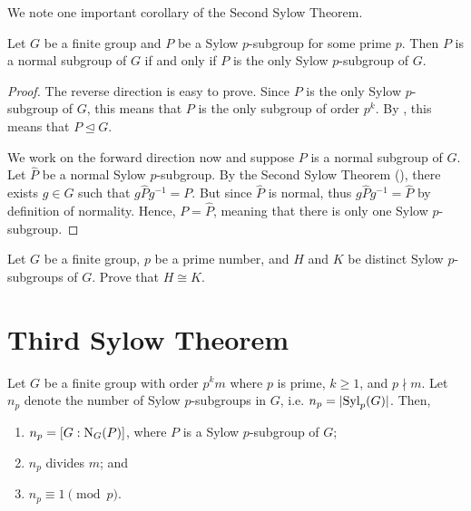 We note one important corollary of the Second Sylow Theorem.
\begin{corollary}\label{corollary-sylow-subgroup-is-normal-if-it-is-unique}
    Let $G$ be a finite group and $P$ be a Sylow $p$-subgroup for some prime $p$. Then $P$ is a normal subgroup of $G$ if and only if $P$ is the only Sylow $p$-subgroup of $G$.
\end{corollary}
\begin{proof}
    The reverse direction is easy to prove. Since $P$ is the only Sylow $p$-subgroup of $G$, this means that $P$ is the only subgroup of order $p^k$. By , this means that $P \unlhd G$.

    We work on the forward direction now and suppose $P$ is a normal subgroup of $G$. Let $\hat{P}$ be a normal Sylow $p$-subgroup. By the Second Sylow Theorem (), there exists $g \in G$ such that $g\hat{P}g^{-1} = P$. But since $\hat{P}$ is normal, thus $g\hat{P}g^{-1} = \hat{P}$ by definition of normality. Hence, $P = \hat{P}$, meaning that there is only one Sylow $p$-subgroup.
\end{proof}

\begin{exercise}
    Let $G$ be a finite group, $p$ be a prime number, and $H$ and $K$ be distinct Sylow $p$-subgroups of $G$. Prove that $H \cong K$.
\end{exercise}

\section{Third Sylow Theorem}
\begin{theorem}\label{thrm-sylow-3}
    Let $G$ be a finite group with order $p^k m$ where $p$ is prime, $k \geq 1$, and $p \nmid m$. Let $n_p$ denote the number of Sylow $p$-subgroups in $G$, i.e. $n_p = |\mathrm{Syl}_{p}(G)|$. Then,
    \begin{enumerate}
        \item $n_p = [G:\mathrm{N}_{G}(P)]$, where $P$ is a Sylow $p$-subgroup of $G$;
        \item $n_p$ divides $m$; and
        \item $n_p \equiv 1 \pmod p$.
    \end{enumerate}
\end{theorem}

